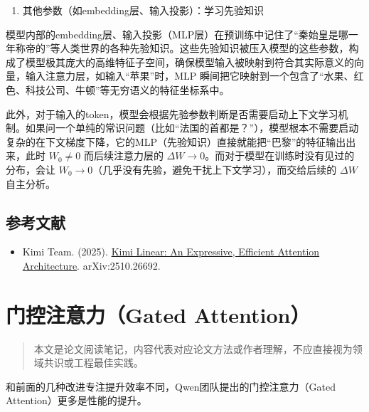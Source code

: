 \begin{enumerate}
\def\labelenumi{\arabic{enumi}.}
\setcounter{enumi}{2}
\tightlist
\item
  其他参数（如embedding层、输入投影）：学习先验知识
\end{enumerate}

模型内部的embedding层、输入投影（MLP层）在预训练中记住了``秦始皇是哪一年称帝的''等人类世界的各种先验知识。这些先验知识被压入模型的这些参数，构成了模型极其庞大的高维特征子空间，确保模型输入被映射到符合其实际意义的向量，输入注意力层，如输入``苹果''时，MLP 瞬间把它映射到一个包含了``水果、红色、科技公司、牛顿''等无穷语义的特征坐标系中。

此外，对于输入的token，模型会根据先验参数判断是否需要启动上下文学习机制。如果问一个单纯的常识问题（比如``法国的首都是？''），模型根本不需要启动复杂的在下文梯度下降，它的MLP（先验知识）直接就能把``巴黎''的特征输出出来，此时 \(W_0\ne 0\) 而后续注意力层的 \(\Delta W\to 0\)。而对于模型在训练时没有见过的分布，会让 \(W_0\to 0\)（几乎没有先验，避免干扰上下文学习），而交给后续的 \(\Delta W\) 自主分析。

\hypertarget{ux53c2ux8003ux6587ux732e-99}{%
\subsection{参考文献}\label{ux53c2ux8003ux6587ux732e-99}}

\vspace{0.25em}
\begin{itemize}
\tightlist
\item
  Kimi Team. (2025). \href{https://arxiv.org/abs/2510.26692}{Kimi Linear: An Expressive, Efficient Attention Architecture}. arXiv:2510.26692.
\end{itemize}

\clearpage

\hypertarget{ux95e8ux63a7ux6ce8ux610fux529bgated-attention}{%
\section{门控注意力（Gated Attention）}\label{ux95e8ux63a7ux6ce8ux610fux529bgated-attention}}

\begin{quote}
本文是论文阅读笔记，内容代表对应论文方法或作者理解，不应直接视为领域共识或工程最佳实践。
\end{quote}

和前面的几种改进专注提升效率不同，Qwen团队提出的门控注意力（Gated Attention）更多是性能的提升。

